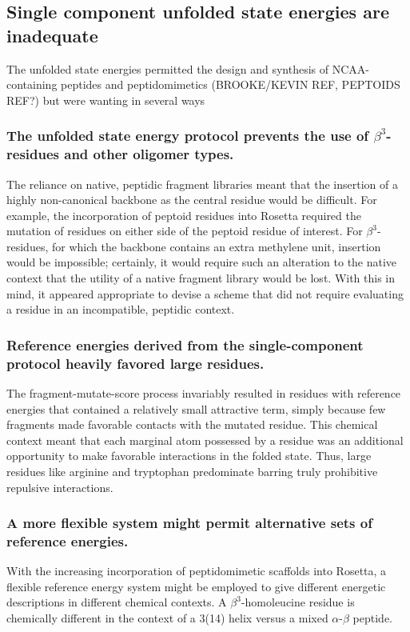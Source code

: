 \subsection{Single component unfolded state energies are inadequate}
The unfolded state energies permitted the design and synthesis of NCAA-containing peptides and peptidomimetics (BROOKE/KEVIN REF, PEPTOIDS REF?) but were wanting in several ways
\subsubsection{The unfolded state energy protocol prevents the use of $\beta^3$-residues and other oligomer types.}
The reliance on native, peptidic fragment libraries meant that the insertion of a highly non-canonical backbone as the central residue would be difficult. 
For example, the incorporation of peptoid residues into Rosetta required the mutation of residues on either side of the peptoid residue of interest. 
For $\beta^3$-residues, for which the backbone contains an extra methylene unit, insertion would be impossible; certainly, it would require such an alteration to the native context that the utility of a native fragment library would be lost. 
With this in mind, it appeared appropriate to devise a scheme that did not require evaluating a residue in an incompatible, peptidic context. 
\subsubsection{Reference energies derived from the single-component protocol heavily favored large residues.}
The fragment-mutate-score process invariably resulted in residues with reference energies that contained a relatively small attractive term, simply because few fragments made favorable contacts with the mutated residue. This chemical context meant that each marginal atom possessed by a residue was an additional opportunity to make favorable interactions in the folded state. Thus, large residues like arginine and tryptophan predominate barring truly prohibitive repulsive interactions.
\subsubsection{A more flexible system might permit alternative sets of reference energies.}
With the increasing incorporation of peptidomimetic scaffolds into Rosetta, a flexible reference energy system might be employed to give different energetic descriptions in different chemical contexts. A $\beta^3$-homoleucine residue is chemically different in the context of a 3(14) helix versus a mixed $\alpha$-$\beta$ peptide.